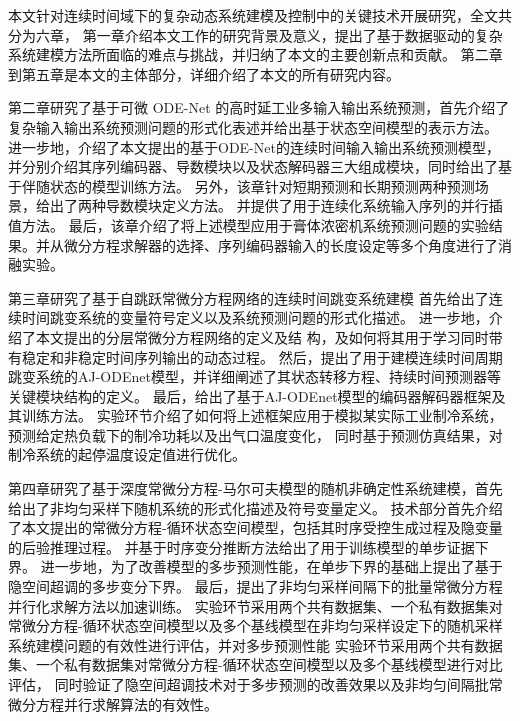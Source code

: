 本文针对连续时间域下的复杂动态系统建模及控制中的关键技术开展研究，全文共分为六章，
第一章介绍本文工作的研究背景及意义，提出了基于数据驱动的复杂系统建模方法所面临的难点与挑战，并归纳了本文的主要创新点和贡献。
第二章到第五章是本文的主体部分，详细介绍了本文的所有研究内容。


第二章研究了基于可微 ODE-Net 的高时延工业多输入输出系统预测，首先介绍了复杂输入输出系统预测问题的形式化表述并给出基于状态空间模型的表示方法。
进一步地，介绍了本文提出的基于ODE-Net的连续时间输入输出系统预测模型，并分别介绍其序列编码器、导数模块以及状态解码器三大组成模块，同时给出了基于伴随状态的模型训练方法。
另外，该章针对短期预测和长期预测两种预测场景，给出了两种导数模块定义方法。
并提供了用于连续化系统输入序列的并行插值方法。
最后，该章介绍了将上述模型应用于膏体浓密机系统预测问题的实验结果。并从微分方程求解器的选择、序列编码器输入的长度设定等多个角度进行了消融实验。

第三章研究了基于自跳跃常微分方程网络的连续时间跳变系统建模
首先给出了连续时间跳变系统的变量符号定义以及系统预测问题的形式化描述。
进一步地，介绍了本文提出的分层常微分方程网络的定义及结
构，及如何将其用于学习同时带有稳定和非稳定时间序列输出的动态过程。
然后，提出了用于建模连续时间周期跳变系统的AJ-ODEnet模型，并详细阐述了其状态转移方程、持续时间预测器等关键模块结构的定义。
最后，给出了基于AJ-ODEnet模型的编码器解码器框架及其训练方法。
实验环节介绍了如何将上述框架应用于模拟某实际工业制冷系统，预测给定热负载下的制冷功耗以及出气口温度变化，
同时基于预测仿真结果，对制冷系统的起停温度设定值进行优化。

第四章研究了基于深度常微分方程-马尔可夫模型的随机非确定性系统建模，首先给出了非均匀采样下随机系统的形式化描述及符号变量定义。
技术部分首先介绍了本文提出的常微分方程-循环状态空间模型，包括其时序受控生成过程及隐变量的后验推理过程。
并基于时序变分推断方法给出了用于训练模型的单步证据下界。
进一步地，为了改善模型的多步预测性能，在单步下界的基础上提出了基于隐空间超调的多步变分下界。
最后，提出了非均匀采样间隔下的批量常微分方程并行化求解方法以加速训练。
实验环节采用两个共有数据集、一个私有数据集对常微分方程-循环状态空间模型以及多个基线模型在非均匀采样设定下的随机采样系统建模问题的有效性进行评估，并对多步预测性能
实验环节采用两个共有数据集、一个私有数据集对常微分方程-循环状态空间模型以及多个基线模型进行对比评估，
同时验证了隐空间超调技术对于多步预测的改善效果以及非均匀间隔批常微分方程并行求解算法的有效性。


